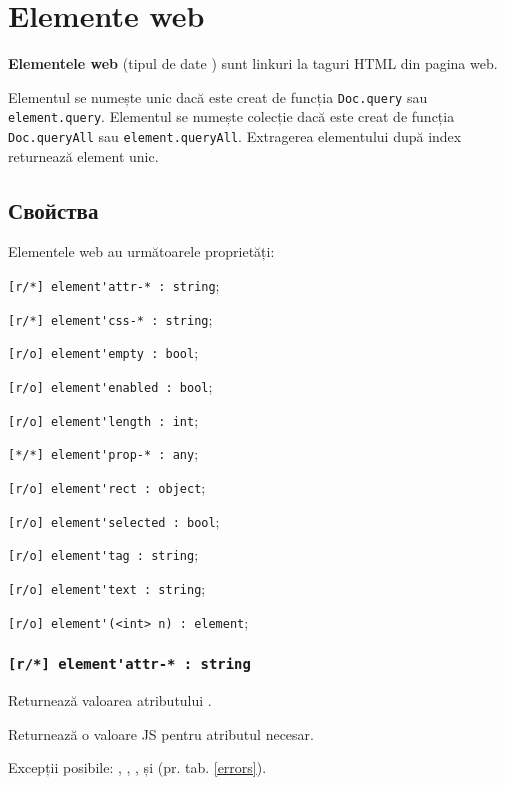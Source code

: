 \section{Elemente web}
\label{webelments}

{\bf Elementele web} (tipul de date \element) sunt linkuri la taguri HTML din pagina web.

Elementul se numește unic dacă este creat de funcția \lstinline|Doc.query| sau \lstinline|element.query|. Elementul se numește colecție dacă este creat de funcția \lstinline|Doc.queryAll| sau \lstinline|element.queryAll|. Extragerea elementului după index returnează element unic. 

\subsection{Свойства}

Elementele web au următoarele proprietăți:
\begin{icItems}
\item \lstinline|[r/*] element'attr-* : string|;
\item \lstinline|[r/*] element'css-* : string|;
\item \lstinline|[r/o] element'empty : bool|;
\item \lstinline|[r/o] element'enabled : bool|;
\item \lstinline|[r/o] element'length : int|;
\item \lstinline|[*/*] element'prop-* : any|;
\item \lstinline|[r/o] element'rect : object|;
\item \lstinline|[r/o] element'selected : bool|;
\item \lstinline|[r/o] element'tag : string|;
\item \lstinline|[r/o] element'text : string|;
\item \lstinline|[r/o] element'(<int> n) : element|;
\end{icItems} 

\subsubsection{\lstinline|[r/*] element'attr-* : string|}

\code{[w3c]} Returnează valoarea atributului \code{*}.

\code{[icL]} Returnează o valoare JS pentru atributul necesar.

Excepții posibile: , , ,  și  (pr. tab. \ref{errors}).

